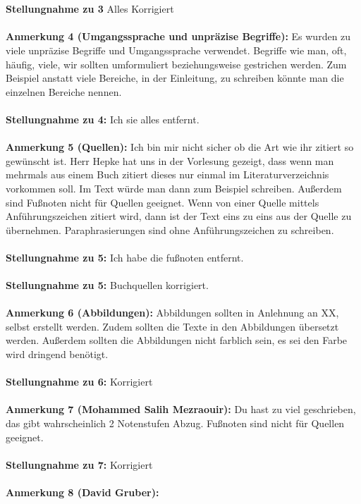 \documentclass[a4paper,12pt]{book}
\begin{document}
\\ \\
\textbf{Stellungnahme zu 3} Alles Korrigiert
\\
\\
\textbf{Anmerkung 4 (Umgangssprache und unpräzise Begriffe):}
Es wurden zu viele unpräzise Begriffe und Umgangssprache verwendet. Begriffe wie \glqq man, oft, häufig, viele, wir\grqq{} sollten umformuliert beziehungsweise gestrichen werden. Zum Beispiel anstatt \glqq viele Bereiche\grqq{}, in der Einleitung, zu schreiben könnte man die einzelnen Bereiche nennen. 
\\ \\
\textbf{Stellungnahme zu 4:} Ich sie alles entfernt.
\\ \\
\textbf{Anmerkung 5 (Quellen):}
Ich bin mir nicht sicher ob die Art wie ihr zitiert so gewünscht ist. Herr Hepke hat uns in der Vorlesung gezeigt, dass wenn man mehrmals aus einem Buch zitiert dieses nur einmal 
im Literaturverzeichnis vorkommen soll. Im Text würde man dann zum Beispiel  \glqq [RN10, 92-102]\grqq{} schreiben. Außerdem sind Fußnoten nicht für Quellen geeignet. 
Wenn von einer Quelle mittels Anführungszeichen zitiert wird, dann ist der Text eins zu eins aus der Quelle zu übernehmen. Paraphrasierungen sind ohne Anführungszeichen zu schreiben. 
\\ \\
\textbf{Stellungnahme zu 5:} Ich habe die fußnoten entfernt.
\\ \\
\textbf{Stellungnahme zu 5:}
Buchquellen korrigiert.
\\ \\ 
\textbf{Anmerkung 6 (Abbildungen):}
Abbildungen sollten in Anlehnung an XX, selbst erstellt werden. Zudem sollten die Texte in den Abbildungen übersetzt werden.  
Außerdem sollten die Abbildungen nicht farblich sein, es sei den Farbe wird dringend benötigt.
 \\  \\
\textbf{Stellungnahme zu 6:} Korrigiert
\\ \\
\textbf{Anmerkung 7 (Mohammed Salih Mezraouir):}
Du hast zu viel geschrieben, das gibt wahrscheinlich 2 Notenstufen Abzug. Fußnoten sind nicht für Quellen geeignet.
 \\  \\
\textbf{Stellungnahme zu 7:} Korrigiert
\\ \\
\textbf{Anmerkung 8 (David Gruber):}
\end{document}
